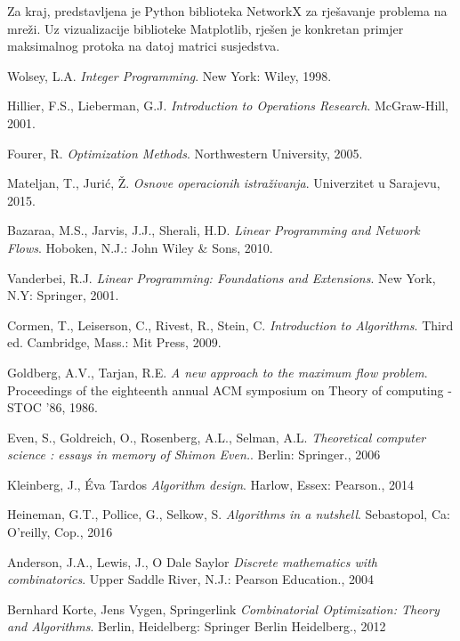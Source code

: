 \documentclass[11pt, a4paper]{article}
\begin{document}
	Za kraj, predstavljena je Python biblioteka NetworkX za rješavanje problema na mreži. Uz vizualizacije biblioteke Matplotlib, rješen je konkretan primjer maksimalnog protoka na datoj matrici susjedstva. 
	
	\newpage
	\begin{thebibliography}{9}
		
		Wolsey, L.A.
		\textit{Integer Programming}.
		New York: Wiley, 1998.
		
		Hillier, F.S., Lieberman, G.J.
		\textit{Introduction to Operations Research}.
		McGraw-Hill, 2001.
		
		Fourer, R.
		\textit{Optimization Methods}.
		Northwestern University, 2005.
		
		Mateljan, T., Jurić, Ž.
		\textit{Osnove operacionih istraživanja}.
		Univerzitet u Sarajevu, 2015.
		
		Bazaraa, M.S., Jarvis, J.J., Sherali, H.D.
		\textit{Linear Programming and Network Flows}.
		Hoboken, N.J.: John Wiley \& Sons, 2010.
		
		Vanderbei, R.J.
		\textit{Linear Programming: Foundations and Extensions}.
		New York, N.Y: Springer, 2001.
		
		Cormen, T., Leiserson, C., Rivest, R., Stein, C.
		\textit{Introduction to Algorithms}.
		 Third ed. Cambridge, Mass.: Mit Press, 2009.
		 
		Goldberg, A.V., Tarjan, R.E. 
		\textit{A new approach to the maximum flow problem}.
		Proceedings of the eighteenth annual ACM symposium on Theory of computing - STOC ’86, 1986.
		
		Even, S., Goldreich, O., Rosenberg, A.L., Selman, A.L. 
		\textit{Theoretical computer science : essays in memory of Shimon Even.}.
		Berlin: Springer., 2006
		
		Kleinberg, J., Éva Tardos
		\textit{Algorithm design}.
		Harlow, Essex: Pearson., 2014
		
		Heineman, G.T., Pollice, G., Selkow, S. 
		\textit{Algorithms in a nutshell}.
		Sebastopol, Ca: O’reilly, Cop., 2016
		
		Anderson, J.A., Lewis, J., O Dale Saylor
		\textit{Discrete mathematics with combinatorics}.
		Upper Saddle River, N.J.: Pearson Education., 2004
		
		Bernhard Korte, Jens Vygen, Springerlink 
		\textit{Combinatorial Optimization: Theory and Algorithms}.
		Berlin, Heidelberg: Springer Berlin Heidelberg., 2012
		
	\end{thebibliography}
	
\end{document}
